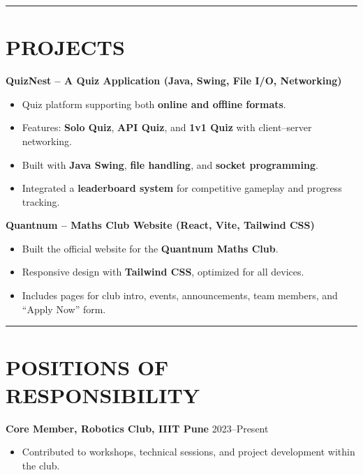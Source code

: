 \documentclass[11pt]{article}
\begin{document}
\vspace{0.6em}
\hrule
\vspace{0.8em}

\section*{PROJECTS}

\noindent
\textbf{QuizNest – A Quiz Application (Java, Swing, File I/O, Networking)}
\begin{itemize}[left=1em,label=--]
  \item Quiz platform supporting both \textbf{online and offline formats}.
  \item Features: \textbf{Solo Quiz}, \textbf{API Quiz}, and \textbf{1v1 Quiz} with client–server networking.
  \item Built with \textbf{Java Swing}, \textbf{file handling}, and \textbf{socket programming}.
  \item Integrated a \textbf{leaderboard system} for competitive gameplay and progress tracking.
\end{itemize}

\vspace{0.5em}

\noindent
\textbf{Quantnum – Maths Club Website (React, Vite, Tailwind CSS)}
\begin{itemize}[left=1em,label=--]
  \item Built the official website for the \textbf{Quantnum Maths Club}.
  \item Responsive design with \textbf{Tailwind CSS}, optimized for all devices.
  \item Includes pages for club intro, events, announcements, team members, and “Apply Now” form.

\end{itemize}

\vspace{0.6em}
\hrule
\vspace{0.8em}

\section*{POSITIONS OF RESPONSIBILITY}

\noindent
\textbf{Core Member, Robotics Club, IIIT Pune} \hfill 2023--Present
\begin{itemize}[left=1em,label=--]
  \item Contributed to workshops, technical sessions, and project development within the club.

\end{itemize}
\end{document}
